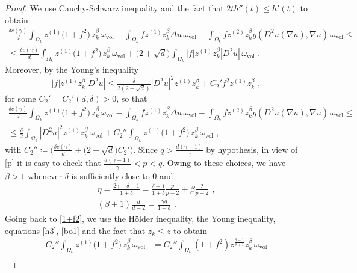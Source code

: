 \documentclass[10pt, a4paper, reqno, oneside]{amsart}
\theoremstyle{plain}
\theoremstyle{definition}
\theoremstyle{plain}
\theoremstyle{definition}
\theoremstyle{plain}
\renewcommand{\=}{:=}
\begin{document}
\begin{proof}
We use Cauchy-Schwarz inequality and the fact that $2th''(t)\leq h'(t)$ to obtain
\begin{multline*}
\tfrac{\delta c(\gamma)}{d} \int_{\Omega_k} z^{(1)}\big(1+f^2\big) \, z_k^{\beta}\, \omega_{\mathrm{vol}}
-\int_{\Omega_k} fz^{(1)}z_k^{\beta}\Delta u\, \omega_{\mathrm{vol}}
-\int_{\Omega_k} fz^{(2)}z_k^{\beta}g(D^2u(\nabla u),\nabla u)\, \omega_{\mathrm{vol}} \leq \\
\leq
\tfrac{\delta c(\gamma)}{d} \int_{\Omega_k} z^{(1)}\big(1+f^2\big) \, z_k^{\beta}\, \omega_{\mathrm{vol}}
+\big(2+\sqrt{d}\big) \int_{\Omega_k}|f|z^{(1)}z_k^{\beta} |D^2u| \, \omega_{\mathrm{vol}} \,\, .
\end{multline*}
Moreover, by the Young's inequality
$$
|f| z^{(1)} z_k^{\beta} |D^2u| \leq
\tfrac{\delta}{2(2+\sqrt{d})}|D^2u|^2 z^{(1)} z_k^{\beta}
+C_2'f^2 z^{(1)} z_k^{\beta}  \,\, ,
$$
for some $C_2'=C_2'(d,\delta)>0$, so that
\begin{multline} \label{1+f2}
\tfrac{\delta c(\gamma)}{d} \int_{\Omega_k} z^{(1)}\big(1+f^2\big) \, z_k^{\beta}\, \omega_{\mathrm{vol}}
-\int_{\Omega_k} fz^{(1)}z_k^{\beta}\Delta u\, \omega_{\mathrm{vol}}
-\int_{\Omega_k} fz^{(2)}z_k^{\beta}g(D^2u(\nabla u),\nabla u)\, \omega_{\mathrm{vol}} \leq \\
\leq
\tfrac{\delta}2 \int_{\Omega_k}|D^2u|^2 z^{(1)} z_k^{\beta}\, \omega_{\mathrm{vol}}
+C_2'' \int_{\Omega_k} z^{(1)}\big(1+f^2\big) \, z_k^{\beta}\, \omega_{\mathrm{vol}} \,\, ,
\end{multline}
with $C_2'' \coloneqq \big(\tfrac{\delta c(\gamma)}{d}+\big(2+\sqrt{d}\big)C_2'\big)$. Since $q>\frac{d(\gamma-1)}{\gamma}$ by hypothesis, in view of \eqref{p} it is easy to check that $\frac{d(\gamma-1)}{\gamma}<p<q$. Owing to these choices, we have $\beta>1$ whenever $\delta$ is sufficiently close to 0 and
\begin{gather}
\eta = \tfrac{2\gamma+\delta-1}{1+\delta}=\tfrac{\delta-1}{1+\delta}\tfrac{p}{p-2}+\beta\tfrac{2}{p-2} \,\, , \label{bo1} \\
(\beta+1)\tfrac{d}{d-2}=\tfrac{\gamma q}{1+\delta} \,\, . \label{bo2}
\end{gather}
Going back to \eqref{1+f2}, we use the H\"older inequality, the Young inequality, equations \eqref{h3}, \eqref{bo1} and the fact that $z_k\leq z$ to obtain
\begin{equation} \label{HY} \begin{aligned}
C_2'' \int_{\Omega_k} z^{(1)}\big(1+f^2\big) \, z_k^{\beta}\, \omega_{\mathrm{vol}} &= C_2'' \int_{\Omega_k}(1+f^2) z^{\frac{\delta-1}{\delta+1}} z_k^{\beta}\, \omega_{\mathrm{vol}} \\

\end{aligned}
\end{equation}
\end{proof}
\end{document}
